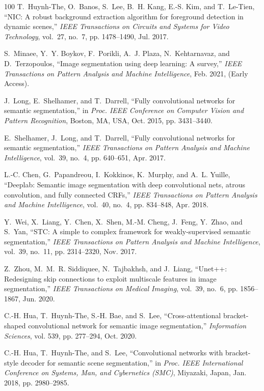 \documentclass[journal]{IEEEtran}
\begin{document}
\begin{thebibliography}{100}
	T.~Huynh-The, O.~Banos, S.~Lee, B.~H. Kang, E.-S. Kim, and T.~Le-Tien, ``{NIC}:
	A robust background extraction algorithm for foreground detection in dynamic
	scenes,'' \emph{IEEE Transactions on Circuits and Systems for Video
		Technology}, vol.~27, no.~7, pp. 1478--1490, Jul. 2017.
	
	S.~Minaee, Y.~Y. Boykov, F.~Porikli, A.~J. Plaza, N.~Kehtarnavaz, and
	D.~Terzopoulos, ``Image segmentation using deep learning: A survey,''
	\emph{IEEE Transactions on Pattern Analysis and Machine Intelligence}, Feb.
	2021, {(Early Access)}.
	
	J.~Long, E.~Shelhamer, and T.~Darrell, ``Fully convolutional networks for
	semantic segmentation,'' in \emph{Proc. IEEE Conference on Computer Vision
		and Pattern Recognition}, Boston, MA, USA, Oct. 2015, pp. 3431--3440.
	
	E.~Shelhamer, J.~Long, and T.~Darrell, ``Fully convolutional networks for
	semantic segmentation,'' \emph{IEEE Transactions on Pattern Analysis and
		Machine Intelligence}, vol.~39, no.~4, pp. 640--651, Apr. 2017.
	
	L.-C. Chen, G.~Papandreou, I.~Kokkinos, K.~Murphy, and A.~L. Yuille, ``Deeplab:
	Semantic image segmentation with deep convolutional nets, atrous convolution,
	and fully connected {CRFs},'' \emph{IEEE Transactions on Pattern Analysis and
		Machine Intelligence}, vol.~40, no.~4, pp. 834--848, Apr. 2018.
	
	Y.~Wei, X.~Liang, Y.~Chen, X.~Shen, M.-M. Cheng, J.~Feng, Y.~Zhao, and S.~Yan,
	``{STC}: A simple to complex framework for weakly-supervised semantic
	segmentation,'' \emph{IEEE Transactions on Pattern Analysis and Machine
		Intelligence}, vol.~39, no.~11, pp. 2314--2320, Nov. 2017.
	
	Z.~Zhou, M.~M.~R. Siddiquee, N.~Tajbakhsh, and J.~Liang, ``{Unet++}:
	Redesigning skip connections to exploit multiscale features in image
	segmentation,'' \emph{IEEE Transactions on Medical Imaging}, vol.~39, no.~6,
	pp. 1856--1867, Jun. 2020.
	
	C.-H. Hua, T.~Huynh-The, S.-H. Bae, and S.~Lee, ``Cross-attentional
	bracket-shaped convolutional network for semantic image segmentation,''
	\emph{Information Sciences}, vol. 539, pp. 277--294, Oct. 2020.
	
	C.-H. Hua, T.~Huynh-The, and S.~Lee, ``Convolutional networks with
	bracket-style decoder for semantic scene segmentation,'' in \emph{Proc. IEEE
		International Conference on Systems, Man, and Cybernetics (SMC)}, Miyazaki,
	Japan, Jan. 2018, pp. 2980--2985.
	

\end{thebibliography}
\end{document}
